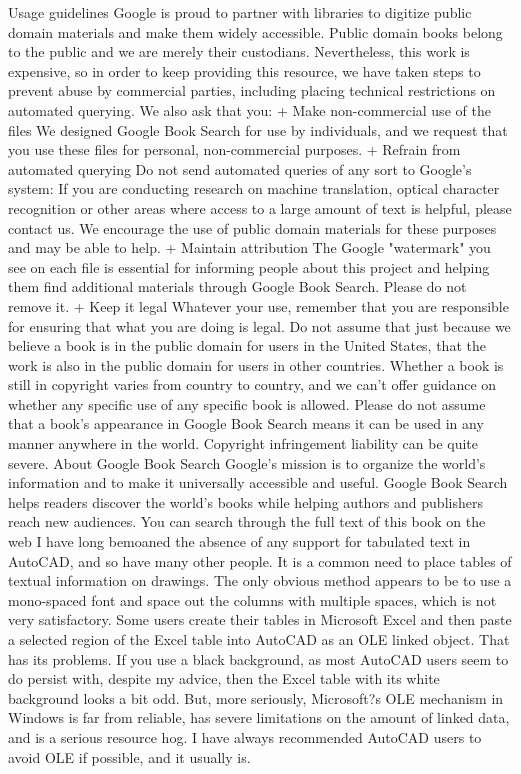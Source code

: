 \documentclass[a4paper]{article}
\begin{document}
{Usage guidelines 
Google is proud to partner with libraries to digitize public domain materials and make them widely accessible. Public domain books belong to the 
public and we are merely their custodians. Nevertheless, this work is expensive, so in order to keep providing this resource, we have taken steps to 
prevent abuse by commercial parties, including placing technical restrictions on automated querying. 
We also ask that you: 
+ Make non-commercial use of the files We designed Google Book Search for use by individuals, and we request that you use these files for 
personal, non-commercial purposes. 
+ Refrain from automated querying Do not send automated queries of any sort to Google's system: If you are conducting research on machine 
translation, optical character recognition or other areas where access to a large amount of text is helpful, please contact us. We encourage the 
use of public domain materials for these purposes and may be able to help. 
+ Maintain attribution The Google "watermark" you see on each file is essential for informing people about this project and helping them find 
additional materials through Google Book Search. Please do not remove it. 
+ Keep it legal Whatever your use, remember that you are responsible for ensuring that what you are doing is legal. Do not assume that just 
because we believe a book is in the public domain for users in the United States, that the work is also in the public domain for users in other 
countries. Whether a book is still in copyright varies from country to country, and we can't offer guidance on whether any specific use of 
any specific book is allowed. Please do not assume that a book's appearance in Google Book Search means it can be used in any manner 
anywhere in the world. Copyright infringement liability can be quite severe. 
About Google Book Search 
Google's mission is to organize the world's information and to make it universally accessible and useful. Google Book Search helps readers 
discover the world's books while helping authors and publishers reach new audiences. You can search through the full text of this book on the web 
I have long bemoaned the absence of any support for tabulated text in AutoCAD, and so have many other people. It is a common need to place tables of textual information on drawings. The only obvious method appears to be to use a mono-spaced font and space out the columns with multiple spaces, which is not very satisfactory.
Some users create their tables in Microsoft Excel and then paste a selected region of the Excel table into AutoCAD as an OLE linked object. That has its problems. If you use a black background, as most AutoCAD users seem to do persist with, despite my advice, then the Excel table with its white background looks a bit odd. But, more seriously, Microsoft?s OLE mechanism in Windows is far from reliable, has severe limitations on the amount of linked data, and is a serious resource hog. I have always recommended AutoCAD users to avoid OLE if possible, and it usually is.
}
\end{document}
